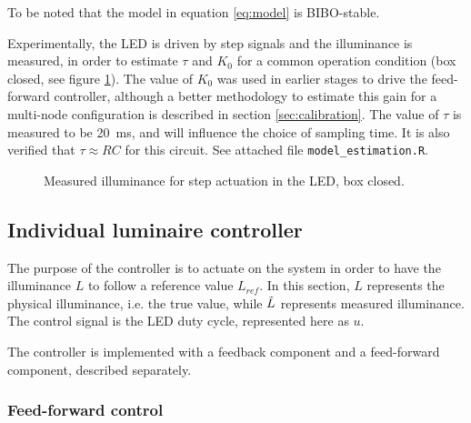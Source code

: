 \documentclass[english,fira]{ist-report}
\begin{document}
To be noted that the model in equation \ref{eq:model} is BIBO-stable.

Experimentally, the LED is driven by step signals and the illuminance is measured, in order to estimate $\tau$ and $K_0$ for a common operation condition (box closed, see figure \ref{fig:steps}). The value of $K_0$ was used in earlier stages to drive the feed-forward controller, although a better methodology to estimate this gain for a multi-node configuration is described in section \ref{sec:calibration}. The value of $\tau$ is measured to be \SI{20}{\milli\second}, and will influence the choice of sampling time. It is also verified that $\tau \approx RC$ for this circuit. See attached file \texttt{model\_estimation.R}.

\begin{figure}[ht]
    \centering
    \caption{Measured illuminance for step actuation in the LED, box closed.}
    \label{fig:steps}
\end{figure}


\subsection{Individual luminaire controller}

The purpose of the controller is to actuate on the system in order to have the illuminance $L$ to follow a reference value $L_{ref}$. In this section, $L$ represents the physical illuminance, i.e. the true value, while $\Tilde{L}$ represents measured illuminance. The control signal is the LED duty cycle, represented here as $u$.

The controller is implemented with a feedback component and a feed-forward component, described separately.

\subsubsection{Feed-forward control}
\end{document}
